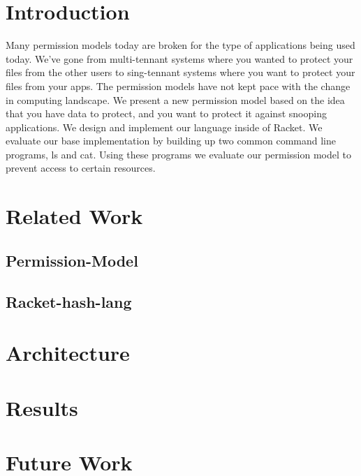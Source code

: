 \section{Introduction}\label{section:Introduction}
Many permission models today are broken for the type of applications being used today. We've gone from multi-tennant systems where you wanted to protect your files from the other users to sing-tennant systems where you want to protect your files from your apps. The permission models have not kept pace with the change in computing landscape. We present a new permission model based on the idea that you have data to protect, and you want to protect it against snooping applications. We design and implement our language inside of Racket\cite{racket}. We evaluate our base implementation by building up two common command line programs, ls and cat. Using these programs we evaluate our permission model to prevent access to certain resources.

\section{Related Work}\label{section:relatedwork}


\subsection{Permission-Model}\label{section:Permssion-model}

\subsection{Racket-hash-lang}\label{section:racket}

\section{Architecture}\label{section:arch}

\section{Results}

\section{Future Work}



